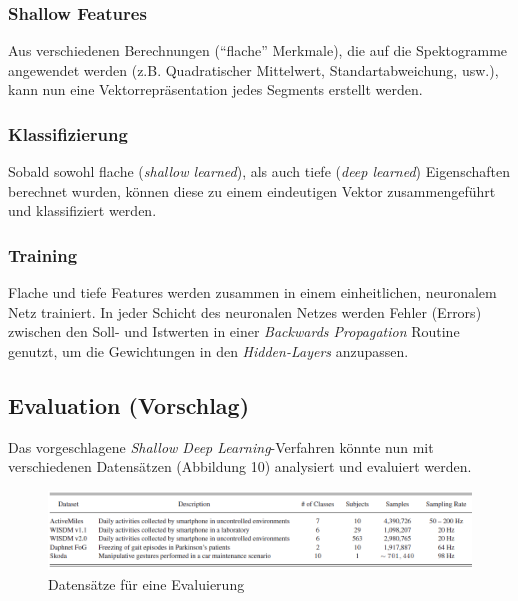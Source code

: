 \documentclass[11pt]{article}
\begin{document}
    \subsubsection{Shallow Features}
    Aus verschiedenen Berechnungen ("`flache"' Merkmale), die auf die Spektogramme angewendet werden
    (z.B. Quadratischer Mittelwert, Standartabweichung, usw.), kann nun eine Vektorrepräsentation
    jedes Segments erstellt werden.

    \subsubsection{Klassifizierung}
    Sobald sowohl flache (\textit{shallow learned}), als auch tiefe (\textit{deep learned})
    Eigenschaften berechnet wurden, können diese zu einem eindeutigen Vektor zusammengeführt und
    klassifiziert werden.

    \subsubsection{Training}
    Flache und tiefe Features werden zusammen in einem einheitlichen, neuronalem Netz trainiert. In
    jeder Schicht des neuronalen Netzes werden Fehler (Errors) zwischen den Soll- und Istwerten in
    einer \textit{Backwards Propagation} Routine genutzt, um die Gewichtungen in den
    \textit{Hidden-Layers} anzupassen.

    \subsection{Evaluation (Vorschlag)}
    Das vorgeschlagene \textit{Shallow Deep Learning}-Verfahren könnte nun mit verschiedenen Datensätzen
    (Abbildung 10) analysiert und evaluiert werden.

    \begin{figure}[ht!]
        \centerings
        \includegraphics[width=16cm]{../../resources/datasets.png}
        \caption{Datensätze für eine Evaluierung}
    \end{figure}

    \newpage

    
    
\end{document}
